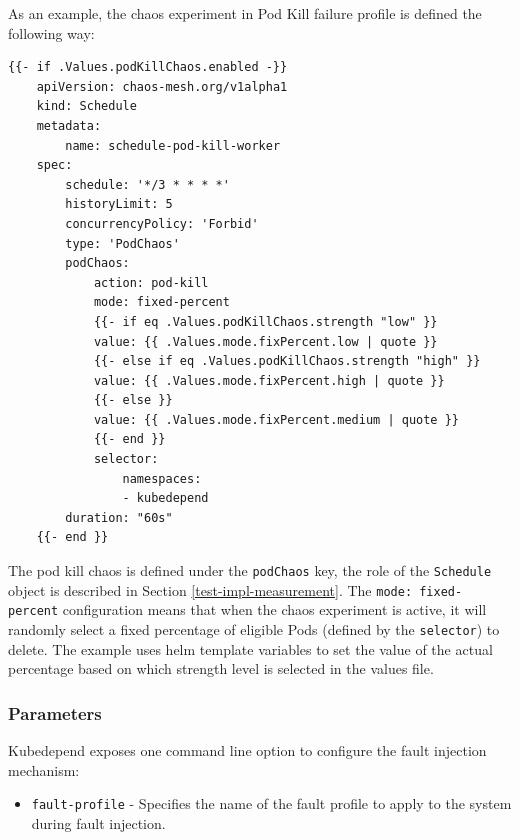 As an example, the chaos experiment in Pod Kill failure profile is defined the following way:

\vspace{0.5cm}
\begin{minipage}{\linewidth}
	\begin{lstlisting}[caption={Pod Kill chaos}, label={lst:pod-kill-chaos}]
	{{- if .Values.podKillChaos.enabled -}}
	apiVersion: chaos-mesh.org/v1alpha1
	kind: Schedule
	metadata:
		name: schedule-pod-kill-worker
	spec:
		schedule: '*/3 * * * *'
		historyLimit: 5
		concurrencyPolicy: 'Forbid'
		type: 'PodChaos'
		podChaos:
			action: pod-kill
			mode: fixed-percent
			{{- if eq .Values.podKillChaos.strength "low" }}
			value: {{ .Values.mode.fixPercent.low | quote }}
			{{- else if eq .Values.podKillChaos.strength "high" }}
			value: {{ .Values.mode.fixPercent.high | quote }}
			{{- else }}
			value: {{ .Values.mode.fixPercent.medium | quote }}
			{{- end }}
			selector:
				namespaces:
				- kubedepend
		duration: "60s"
	{{- end }}
	\end{lstlisting}
\end{minipage}

The pod kill chaos is defined under the \texttt{podChaos} key, the role of the \texttt{Schedule} object is described in Section \ref{test-impl-measurement}. The \texttt{mode: fixed-percent} configuration means that when the chaos experiment is active, it will randomly select a fixed percentage of eligible Pods (defined by the \texttt{selector}) to delete. The example uses helm template variables to set the value of the actual percentage based on which strength level is selected in the values file.

\subsubsection{Parameters}

Kubedepend exposes one command line option to configure the fault injection mechanism:

\begin{itemize}
	\item \texttt{fault-profile} - Specifies the name of the fault profile to apply to the system during fault injection.
\end{itemize}

